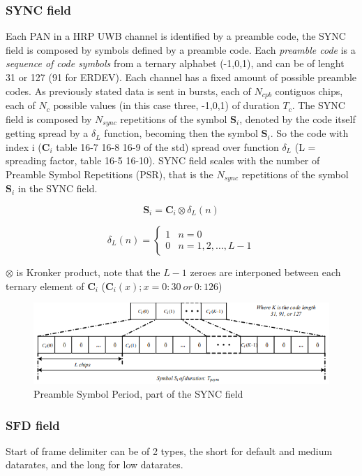 \documentclass[conference]{IEEEtran}
\begin{document}
\subsubsection{SYNC field}
\label{SYNC}
Each PAN in a HRP UWB channel is identified by a preamble code, the SYNC field is composed 
by symbols defined by a preamble code. Each \emph{preamble code} is a \emph{sequence of code 
symbols} from a ternary alphabet (-1,0,1), and can be of lenght 31 or 127 (91 for ERDEV). 
Each channel has a fixed amount of possible preamble codes. As previously stated data is sent 
in bursts, each of $N_{cpb}$ contiguos chips, each of $N_{c}$ possible values (in this case 
three, -1,0,1) of duration $T_{c}$. The SYNC field is composed by $N_{sync}$ repetitions of 
the symbol $\mathbf{S}_i$, denoted by the code itself getting spread by a $\delta_{L}$ function,
becoming then the symbol $\mathbf{S}_i$. So the code with index i ($\mathbf{C}_i$ table 16-7 
16-8 16-9 of the std) spread over function $\delta_{L}$ (L = spreading factor, table 16-5 
16-10). SYNC field scales with the number of Preamble Symbol Repetitions (PSR), that is the
$N_{sync}$ repetitions of the symbol $\mathbf{S}_i$ in the SYNC field.

\[
\mathbf{S}_i = \mathbf{C}_i \otimes \delta_L(n)
\]

\[
\delta_L(n) =
\begin{cases} 
1 & n = 0 \\
0 & n = 1, 2, \dots, L-1
\end{cases}
\]

$\otimes$ is Kronker product, note that the $L-1$ zeroes are interponed between each ternary
element of $\mathbf{C}_i$ ($\mathbf{C}_i(x); x=0:30\ or\ 0:126$)


\begin{figure}[!h]
  \centering
  \includegraphics[width=\linewidth]{PSYM}
  \caption{Preamble Symbol Period, part of the SYNC field}
  \label{fig:PSYM}
\end{figure}

\subsubsection{SFD field}
Start of frame delimiter can be of 2 types, the short for default and medium datarates, and
the long for low datarates. 
\end{document}
